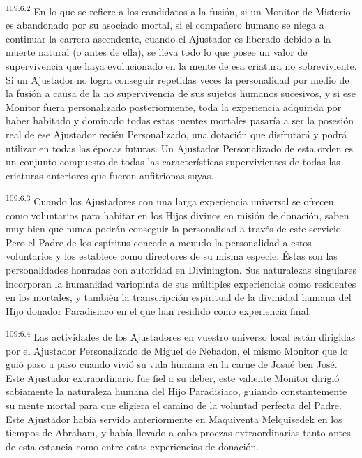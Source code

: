 \par
\textsuperscript{109:6.2} En lo que se refiere a los candidatos a la fusión, si un Monitor de Misterio es abandonado por su asociado mortal, si el compañero humano se niega a continuar la carrera ascendente, cuando el Ajustador es liberado debido a la muerte natural (o antes de ella), se lleva todo lo que posee un valor de supervivencia que haya evolucionado en la mente de esa criatura no sobreviviente. Si un Ajustador no logra conseguir repetidas veces la personalidad por medio de la fusión a causa de la no supervivencia de sus sujetos humanos sucesivos, y si ese Monitor fuera personalizado posteriormente, toda la experiencia adquirida por haber habitado y dominado todas estas mentes mortales pasaría a ser la posesión real de ese Ajustador recién Personalizado, una dotación que disfrutará y podrá utilizar en todas las épocas futuras. Un Ajustador Personalizado de esta orden es un conjunto compuesto de todas las características supervivientes de todas las criaturas anteriores que fueron anfitrionas suyas.

\par
\textsuperscript{109:6.3} Cuando los Ajustadores con una larga experiencia universal se ofrecen como voluntarios para habitar en los Hijos divinos en misión de donación, saben muy bien que nunca podrán conseguir la personalidad a través de este servicio. Pero el Padre de los espíritus concede a menudo la personalidad a estos voluntarios y los establece como directores de su misma especie. Éstas son las personalidades honradas con autoridad en Divinington. Sus naturalezas singulares incorporan la humanidad variopinta de sus múltiples experiencias como residentes en los mortales, y también la transcripción espiritual de la divinidad humana del Hijo donador Paradisiaco en el que han residido como experiencia final.

\par
\textsuperscript{109:6.4} Las actividades de los Ajustadores en vuestro universo local están dirigidas por el Ajustador Personalizado de Miguel de Nebadon, el mismo Monitor que lo guió paso a paso cuando vivió su vida humana en la carne de Josué ben José. Este Ajustador extraordinario fue fiel a su deber, este valiente Monitor dirigió sabiamente la naturaleza humana del Hijo Paradisiaco, guiando constantemente su mente mortal para que eligiera el camino de la voluntad perfecta del Padre. Este Ajustador había servido anteriormente en Maquiventa Melquisedek en los tiempos de Abraham, y había llevado a cabo proezas extraordinarias tanto antes de esta estancia como entre estas experiencias de donación.

